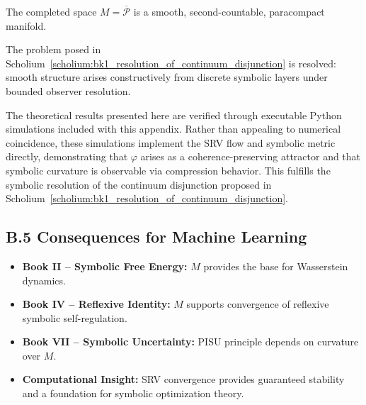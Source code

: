 \begin{theorem}
\label{theorem:appB_smoothness_emergence}
The completed space $M = \overline{\mathcal{P}}$ is a smooth, second-countable, paracompact manifold.
\end{theorem}

\begin{corollary}
\label{corollary:appB_resolution_of_smoothness}
The problem posed in Scholium~\ref{scholium:bk1_resolution_of_continuum_disjunction} is resolved: smooth structure arises constructively from discrete symbolic layers under bounded observer resolution.
\end{corollary}

\begin{remark}
The theoretical results presented here are verified through executable Python simulations included with this appendix. 
Rather than appealing to numerical coincidence, these simulations implement the SRV flow and symbolic metric directly, 
demonstrating that $\varphi$ arises as a coherence-preserving attractor and that symbolic curvature is observable via compression behavior.
This fulfills the symbolic resolution of the continuum disjunction proposed in Scholium~\ref{scholium:bk1_resolution_of_continuum_disjunction}.
\end{remark}

\subsection*{B.5 Consequences for Machine Learning}
\label{subsec:appB_ml_consequences}

\begin{itemize}
\item \textbf{Book II – Symbolic Free Energy:} $M$ provides the base for Wasserstein dynamics.
\item \textbf{Book IV – Reflexive Identity:} $M$ supports convergence of reflexive symbolic self-regulation.
\item \textbf{Book VII – Symbolic Uncertainty:} PISU principle depends on curvature over $M$.
\item \textbf{Computational Insight:} SRV convergence provides guaranteed stability and a foundation for symbolic optimization theory.
\end{itemize}

